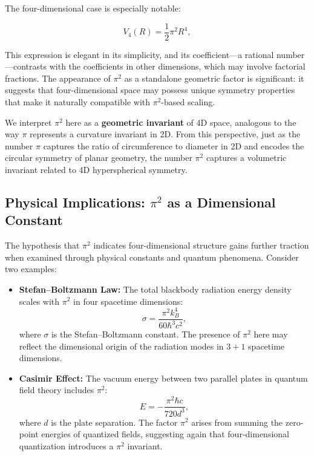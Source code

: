 \documentclass[12pt,a4paper]{article}
\begin{document}
The four-dimensional case is especially notable:

\begin{equation}
V_4(R) = \frac{1}{2} \pi^2 R^4,
\end{equation}

This expression is elegant in its simplicity, and its coefficient—a rational number—contrasts with the coefficients in other dimensions, which may involve factorial fractions. The appearance of \(\pi^2\) as a standalone geometric factor is significant: it suggests that four-dimensional space may possess unique symmetry properties that make it naturally compatible with \(\pi^2\)-based scaling.

We interpret \(\pi^2\) here as a \textbf{geometric invariant} of 4D space, analogous to the way \(\pi\) represents a curvature invariant in 2D. From this perspective, just as the number \(\pi\) captures the ratio of circumference to diameter in 2D and encodes the circular symmetry of planar geometry, the number \(\pi^2\) captures a volumetric invariant related to 4D hyperspherical symmetry.

\subsection{Physical Implications: \(\pi^2\) as a Dimensional Constant}

The hypothesis that \(\pi^2\) indicates four-dimensional structure gains further traction when examined through physical constants and quantum phenomena. Consider two examples:

\begin{itemize}
\item \textbf{Stefan–Boltzmann Law:} The total blackbody radiation energy density scales with \(\pi^2\) in four spacetime dimensions:
 \begin{equation}
 \sigma = \frac{\pi^2 k_B^4}{60 \hbar^3 c^2},
 \end{equation}
 where \(\sigma\) is the Stefan–Boltzmann constant. The presence of \(\pi^2\) here may reflect the dimensional origin of the radiation modes in \(3+1\) spacetime dimensions.

 \item \textbf{Casimir Effect:} The vacuum energy between two parallel plates in quantum field theory includes \(\pi^2\):
 \begin{equation}
 E = -\frac{\pi^2 \hbar c}{720 d^3},
 \end{equation}
 where \(d\) is the plate separation. The factor \(\pi^2\) arises from summing the zero-point energies of quantized fields, suggesting again that four-dimensional quantization introduces a \(\pi^2\) invariant.
\end{itemize}
\end{document}
